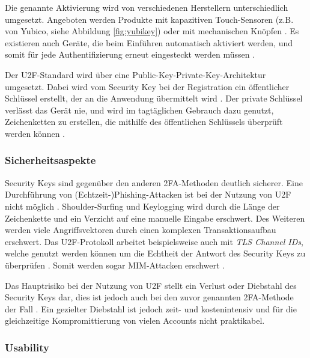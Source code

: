 Die genannte Aktivierung wird von verschiedenen Herstellern unterschiedlich umgesetzt. Angeboten werden Produkte mit kapazitiven Touch-Sensoren (z.B. von Yubico, siehe Abbildung \ref{fig:yubikey}) oder mit mechanischen Knöpfen \parencite{langSecurityKeys2017}. Es existieren auch Geräte, die beim Einführen automatisch aktiviert werden, und somit für jede Authentifizierung erneut eingesteckt werden müssen \parencite{langSecurityKeys2017}.

Der \ac{U2F}-Standard wird über eine Public-Key-Private-Key-Architektur umgesetzt. Dabei wird vom Security Key bei der Registration ein öffentlicher Schlüssel erstellt, der an die Anwendung übermittelt wird \parencite{langSecurityKeys2017}. Der private Schlüssel verlässt das Gerät nie, und wird im tagtäglichen Gebrauch dazu genutzt, Zeichenketten zu erstellen, die mithilfe des öffentlichen Schlüssels überprüft werden können \parencite{reeseUsabilityStudy2019}.

\subsubsection{Sicherheitsaspekte}

Security Keys sind gegenüber den anderen \ac{2FA}-Methoden deutlich sicherer. Eine Durchführung von (Echtzeit-)Phishing-Attacken ist bei der Nutzung von \ac{U2F} nicht möglich \parencite{langSecurityKeys2017}. Shoulder-Surfing und Keylogging wird durch die Länge der Zeichenkette und ein Verzicht auf eine manuelle Eingabe erschwert. Des Weiteren werden viele Angriffsvektoren durch einen komplexen Transaktionsaufbau erschwert. Das \ac{U2F}-Protokoll arbeitet beispielsweise auch mit \textit{TLS Channel IDs}, welche genutzt werden können um die Echtheit der Antwort des Security Keys zu überprüfen \parencite{langSecurityKeys2017}. Somit werden sogar \ac{MIM}-Attacken erschwert \parencite{langSecurityKeys2017}.

Das Hauptrisiko bei der Nutzung von \ac{U2F} stellt ein Verlust oder Diebstahl des Security Keys dar, dies ist jedoch auch bei den zuvor genannten \ac{2FA}-Methode der Fall \parencite{reeseUsabilityStudy2019}. Ein gezielter Diebstahl ist jedoch zeit- und kostenintensiv und für die gleichzeitige Kompromittierung von vielen Accounts nicht praktikabel.

\subsubsection{Usability}

